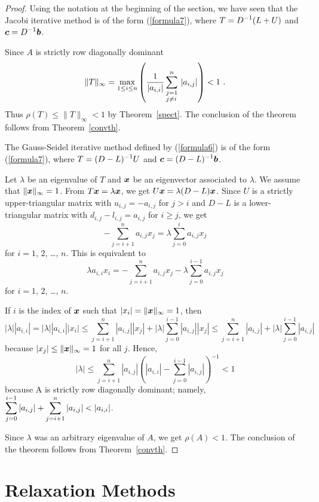 \begin{proof}
  Using the notation at the beginning
of the section, we have seen that the Jacobi iterative method is of
the form (\ref{formula7}), where $\displaystyle T = D^{-1}(L + U)$ and
$\displaystyle \bm{c} = D^{-1}\bm{b}$.

Since $A$ is strictly row diagonally dominant
\[
\|T\|_\infty = \max_{1\leq i \leq n}\left( \frac{1}{|a_{i,i}|}
\sum_{\begin{subarray}{l} j=1 \\j \neq i \end{subarray}}^n \,
|a_{i,j}| \right) < 1 \ .
\]
Thus $\rho(T) \leq \|T \|_\infty < 1$ by Theorem~\ref{spect}.  The
conclusion of the theorem follows from Theorem~\ref{convth}.

The Gauss-Seidel iterative method defined by (\ref{formula6}) is of
the form (\ref{formula7}), where $\displaystyle T = (D-L)^{-1} U$ and
$\displaystyle \bm{c} = (D-L)^{-1}\bm{b}$.

Let $\lambda$ be an eigenvalue of $T$ and $\bm{x}$ be an eigenvector
associated to $\lambda$.  We assume that $\| \bm{x} \|_\infty = 1$.
From $T\bm{x} = \lambda \bm{x}$, we get
$U \bm{x} = \lambda (D-L)\bm{x}$.  Since $U$ is a strictly
upper-triangular matrix with $u_{i,j} = -a_{i,j}$ for $j>i$ and $D-L$ is a
lower-triangular matrix with $d_{i,j} - l_{i,j} = a_{i,j}$ for
$i\geq j$, we get
\[
-\sum_{j=i+1}^n a_{i,j} x_j= \lambda \sum_{j=0}^i a_{i,j} x_j
\]
for $i=1$, $2$, \ldots, $n$.
This is equivalent to
\[
\lambda a_{i,i} x_i = -\sum_{j=i+1}^n a_{i,j} x_j
- \lambda \sum_{j=0}^{i-1} a_{i,j} x_j
\]
for $i=1$, $2$, \ldots, $n$.

If $i$ is the index of $\bm{x}$ such that
$|x_i| = \|\bm{x}\|_\infty = 1$, then
\[
|\lambda| |a_{i,i}|
= |\lambda| |a_{i,i}| |x_i| \leq \sum_{j=i+1}^n |a_{i,j}| |x_j|
+ |\lambda| \sum_{j=0}^{i-1} |a_{i,j}| |x_j|
\leq \sum_{j=i+1}^n |a_{i,j}|
+ |\lambda| \sum_{j=0}^{i-1} |a_{i,j}|
\]
because $|x_j| \leq \|\bm{x}\|_\infty = 1$ for all $j$.  Hence,
\[
|\lambda| \leq \sum_{j=i+1}^n |a_{i,j}| \left(
|a_{i,i}| - \sum_{j=0}^{i-1} |a_{i,j}| \right)^{-1}
<1
\]
because A is strictly row diagonally dominant; namely,
$\displaystyle \sum_{j=0}^{i-1} |a_{i,j}| + \sum_{j=i+1}^n |a_{i,j}| <
|a_{i,i}|$.

Since $\lambda$ was an arbitrary eigenvalue of $A$, we get
$\rho(A)<1$.  The conclusion of the theorem follows from
Theorem~\ref{convth}.
\end{proof}

\section{Relaxation Methods}

